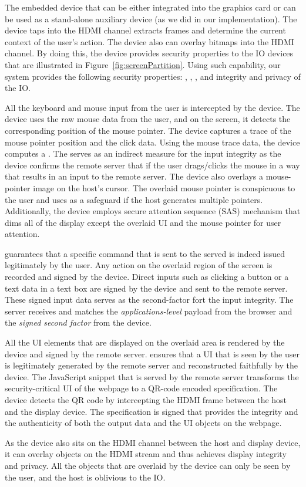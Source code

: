 The embedded device that can be either integrated into the graphics card or can be used as a stand-alone auxiliary device (as we did in our implementation). The device taps into the HDMI channel extracts frames and determine the current context of the user's action. The device also can overlay bitmaps into the HDMI channel. By doing this, the device provides security properties to the IO devices that are illustrated in Figure~\ref{fig:screenPartition}. Using such capability, our system provides the following security properties: \emph{\pop}, \emph{\poui}, \emph{\poa}, and integrity and privacy of the IO.

\myparagraph{\Pop} All the keyboard and mouse input from the user is intercepted by the device. The device uses the raw mouse data from the user, and on the screen, it detects the corresponding position of the mouse pointer. The device captures a trace of the mouse pointer position and the click data. Using the mouse trace data, the device computes a \emph{\pop}. The \pop serves as an indirect measure for the input integrity as the device confirms the remote server that if the user drags/clicks the mouse in a way that results in an input to the remote server. The device also overlays a mouse-pointer image on the host's cursor. The overlaid mouse pointer is conspicuous to the user and uses as a safeguard if the host generates multiple pointers. Additionally, the device employs secure attention sequence (SAS) mechanism that dims all of the display except the overlaid UI and the mouse pointer for user attention.

\myparagraph{\poa} \Poa guarantees that a specific command that is sent to the served is indeed issued legitimately by the user. Any action on the overlaid region of the screen is recorded and signed by the device.  Direct inputs such as clicking a button or a text data in a text box are signed by the device and sent to the remote server. These signed input data serves as the second-factor fort the input integrity. The server receives and matches the \emph{applications-level} payload from the browser and the \emph{signed second factor} from the device. 

\myparagraph{\Poui} All the UI elements that are displayed on the overlaid area is rendered by the device and signed by the remote server. \Poui ensures that a UI that is seen by the user is legitimately generated by the remote server and reconstructed faithfully by the device. The JavaScript snippet that is served by the remote server transforms the security-critical UI of the webpage to a QR-code encoded specification. The device detects the QR code by intercepting the HDMI frame between the host and the display device. The specification is signed that provides the integrity and the authenticity of both the output data and the UI objects on the webpage. 

 As the device also sits on the HDMI channel between the host and display device, it can overlay objects on the HDMI stream and thus achieves display integrity and privacy. All the objects that are overlaid by the device can only be seen by the user, and the host is oblivious to the IO.



